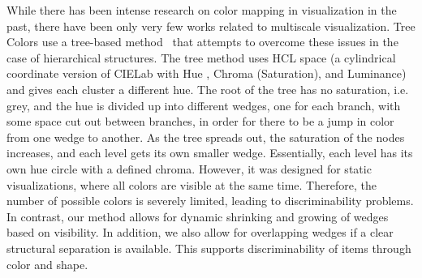 \documentclass{egpubl}
\begin{document}
		While there has been intense research on color mapping in visualization in the past, there have been only very few works related to multiscale visualization.
	Tree Colors use a tree-based method~\cite{tennekes2014tree} that attempts to overcome these issues in the case of hierarchical structures. 
	The tree method uses HCL space (a cylindrical coordinate version of CIELab with Hue , Chroma (Saturation), and Luminance) and gives each cluster a different hue. 
	The root of the tree has no saturation, i.e. grey, and the hue is divided up into different wedges, one for each branch, with some space cut out between branches, in order for there to be a jump in color from one wedge to another. 
	As the tree spreads out, the saturation of the nodes increases, and each level gets its own smaller wedge. 
	Essentially, each level has its own hue circle with a defined chroma. 
	However, it was designed for static visualizations, where all colors are visible at the same time. Therefore, the number of possible colors is severely limited, leading to discriminability problems.
	In contrast, our method allows for dynamic shrinking and growing of wedges based on visibility. 
	In addition, we also allow for overlapping wedges if a clear structural separation is available. 
	This supports discriminability of items through color and shape. 
	
	
	
\end{document}
